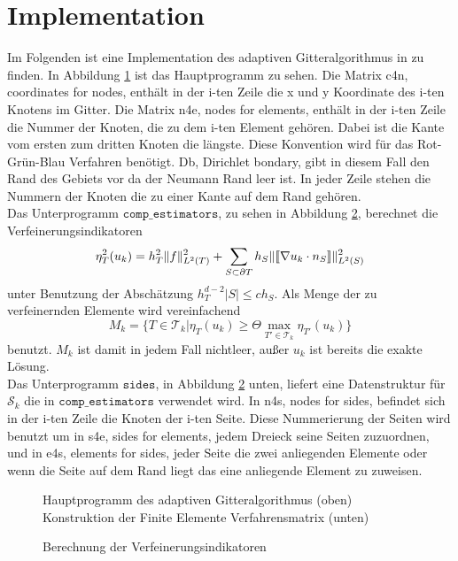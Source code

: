 \section{Implementation}
Im Folgenden ist eine Implementation des adaptiven Gitteralgorithmus in \matlab \: zu finden. In Abbildung \ref{main} ist das Hauptprogramm zu sehen. Die Matrix c4n, coordinates for nodes, enthält in der i-ten Zeile die x und y Koordinate des i-ten Knotens im Gitter. Die Matrix n4e, nodes for elements, enthält in der i-ten Zeile die Nummer der Knoten, die zu dem i-ten Element gehören. Dabei ist die Kante vom ersten zum dritten Knoten die längste. Diese Konvention wird für das Rot-Grün-Blau Verfahren benötigt. Db, Dirichlet bondary, gibt in diesem Fall den Rand des Gebiets vor da der Neumann Rand leer ist. In jeder Zeile stehen die Nummern der Knoten die zu einer Kante auf dem Rand gehören. \\
Das Unterprogramm $\texttt{comp\_estimators}$, zu sehen in Abbildung \ref{indi}, berechnet die Verfeinerungsindikatoren
\[
\eta^2_T(u_k) = h^2_T\|f\|^2_{L^2(T)} + \sum_{S\subset\partial T} h_S\|\llbracket \nabla u_k \cdot n_S\rrbracket\|^2_{L^2(S)} 
\]
unter Benutzung der Abschätzung $h_T^{d-2}|S| \leq ch_S$.
Als Menge der zu verfeinernden Elemente wird vereinfachend
\[
M_k = \{T\in\mathscr{T}_k | \eta_T(u_k)\geq \Theta \max_{T'\in \mathscr{T}_k} \eta_{T'}(u_k)\}
\]
benutzt. $M_k$ ist damit in jedem Fall nichtleer, außer $u_k$ ist bereits die exakte Lösung. \\
Das Unterprogramm $\texttt{sides}$, in Abbildung \ref{indi} unten, liefert eine Datenstruktur für $\mathscr{S}_k$ die in $\texttt{comp\_estimators}$ verwendet wird. In n4s, nodes for sides, befindet sich in der i-ten Zeile die Knoten der i-ten Seite. Diese Nummerierung der Seiten wird benutzt um in s4e, sides for elements, jedem Dreieck seine Seiten zuzuordnen, und in e4s, elements for sides, jeder Seite die zwei anliegenden Elemente oder wenn die Seite auf dem Rand liegt das eine anliegende Element zu zuweisen.

\begin{figure}[!htbp]
	
	\caption{ \label{main}Hauptprogramm des adaptiven Gitteralgorithmus (oben) Konstruktion der Finite Elemente Verfahrensmatrix (unten)}
\end{figure}
\begin{figure}[!htbp]
	
	\caption{\label{indi}Berechnung der Verfeinerungsindikatoren}
\end{figure}

